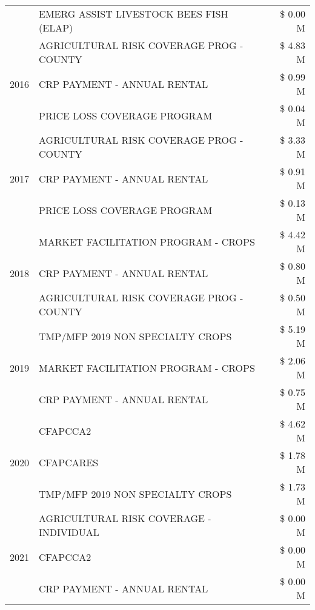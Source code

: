 \begin{tabular}{llr}
 & EMERG ASSIST LIVESTOCK BEES FISH (ELAP) & \$ 0.00 M \\
\cline{1-3}
\multirow[t]{3}{*}{2016} & AGRICULTURAL RISK COVERAGE PROG - COUNTY      & \$ 4.83 M \\
 & CRP PAYMENT - ANNUAL RENTAL                   & \$ 0.99 M \\
 & PRICE LOSS COVERAGE PROGRAM                   & \$ 0.04 M \\
\cline{1-3}
\multirow[t]{3}{*}{2017} & AGRICULTURAL RISK COVERAGE PROG - COUNTY & \$ 3.33 M \\
 & CRP PAYMENT - ANNUAL RENTAL & \$ 0.91 M \\
 & PRICE LOSS COVERAGE PROGRAM & \$ 0.13 M \\
\cline{1-3}
\multirow[t]{3}{*}{2018} & MARKET FACILITATION PROGRAM - CROPS & \$ 4.42 M \\
 & CRP PAYMENT - ANNUAL RENTAL & \$ 0.80 M \\
 & AGRICULTURAL RISK COVERAGE PROG - COUNTY & \$ 0.50 M \\
\cline{1-3}
\multirow[t]{3}{*}{2019} & TMP/MFP 2019 NON SPECIALTY CROPS & \$ 5.19 M \\
 & MARKET FACILITATION PROGRAM - CROPS & \$ 2.06 M \\
 & CRP PAYMENT - ANNUAL RENTAL & \$ 0.75 M \\
\cline{1-3}
\multirow[t]{3}{*}{2020} & CFAPCCA2 & \$ 4.62 M \\
 & CFAPCARES & \$ 1.78 M \\
 & TMP/MFP 2019 NON SPECIALTY CROPS & \$ 1.73 M \\
\cline{1-3}
\multirow[t]{3}{*}{2021} & AGRICULTURAL RISK COVERAGE - INDIVIDUAL & \$ 0.00 M \\
 & CFAPCCA2 & \$ 0.00 M \\
 & CRP PAYMENT - ANNUAL RENTAL & \$ 0.00 M \\
\cline{1-3}
\bottomrule
\end{tabular}
